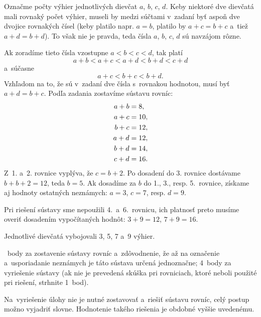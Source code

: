 {%
Označme počty výhier jednotlivých dievčat $a$, $b$, $c$, $d$.
Keby niektoré dve dievčatá mali rovnaký počet výhier, museli by medzi súčtami
v~zadaní byť aspoň dve dvojice rovnakých čísel (keby platilo napr. $a=b$,
platilo by $a+c=b+c$ a~tiež $a+d=b+d$).
To však nie je pravda, teda čísla $a$, $b$, $c$, $d$ sú navzájom rôzne.

Ak zoradíme tieto čísla vzostupne $a<b<c<d$, tak platí
$$
a+b < a+c < a+d < b+d < c+d
$$
a~súčasne
$$
a+c < b+c < b+d.
$$
Vzhľadom na to, že sú v~zadaní dve čísla s~rovnakou hodnotou, musí byť
$a+d=b+c$.
Podľa zadania zostavíme sústavu rovníc:
$$
\aligned
a+b&=8,\\
a+c&=10,\\
b+c&=12,\\
a+d&=12,\\
b+d&=14,\\
c+d&=16.
\endaligned
$$
Z~1. a~2. rovnice vyplýva, že $c=b+2$.
Po dosadení do 3. rovnice dostávame $b+b+2=12$, teda $b=5$.
Ak dosadíme za $b$ do 1., 3., resp. 5.~rovnice, získame aj hodnoty ostatných
neznámych: $a=3$, $c=7$, resp. $d=9$.

Pri riešení sústavy sme nepoužili 4.~a~6.~rovnicu, ich platnosť preto
musíme overiť dosadením vypočítaných hodnôt:
$3+9=12$, $7+9=16$.

Jednotlivé dievčatá vybojovali 3, 5, 7 a~9 výhier.

~body za zostavenie sústavy rovníc a~zdôvodnenie, že
až na označenie a~usporiadanie neznámych je táto sústava určená jednoznačne;
4~body za vyriešenie sústavy
(ak nie je prevedená skúška pri rovniciach, ktoré neboli použité pri riešení,
strhnite 1~bod).

\poznamka
Na~vyriešenie úlohy nie je nutné zostavovať a~riešiť sústavu rovníc,
celý postup možno vyjadriť slovne.
Hodnotenie takého riešenia je obdobné vyššie uvedenému.
\endhodnotenie
}

